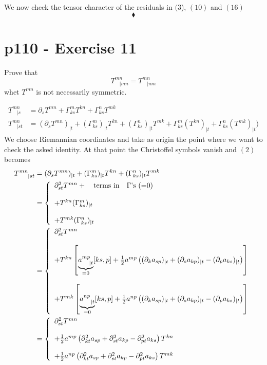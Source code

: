 We now check the tensor character of the residuals in $(3$), $(10)$ and $(16)$
$$\blacklozenge$$
\newpage



\section{p110 - Exercise 11}
\begin{tcolorbox}
Prove that $$T^{mn}_{\ \ \ \ |mn} =T^{mn}_{\ \ \ \ |nm}$$ whet $T^{mn}$ is not necessarily symmetric.
\end{tcolorbox}
\begin{align}
T^{mn}_{\ \ \ \ |s} &= \partial_s T^{mn} + \Gamma^m_{ks}T^{kn} + \Gamma^n_{ks}T^{mk}\\
T^{mn}_{\ \ \ \ |st} &= (\partial_s T^{mn})_{|t} + (\Gamma^m_{ks})_{|t}T^{kn} + (\Gamma^n_{ks})_{|t}T^{mk}+ \Gamma^m_{ks}(T^{kn})_{|t} + \Gamma^n_{ks}(T^{mk})_{|t})
\end{align}
We choose Riemannian coordinates and take as origin the point where we want to check the asked identity. At that point the Christoffel symbols vanish and $(2)$ becomes
\begin{align}
T^{mn}_{\ \ \ \ |st} &= (\partial_s T^{mn})_{|t} + (\Gamma^m_{ks})_{|t}T^{kn} + (\Gamma^n_{ks})_{|t}T^{mk}\\
&= \left\{\begin{array}{l}\partial^2_{st}T^{mn}+\quad \text{terms in}\quad \Gamma\text{'s (=0)}\\\\ + T^{kn} (\Gamma^m_{ks})_{|t}\\\\ + T^{mk} (\Gamma^n_{ks})_{|t}\end{array}\right.\\
&= \left\{\begin{array}{l}\partial^2_{st}T^{mn}\\\\ + T^{kn} \left[\underbrace{a^{mp}_{\ \ \ |t}}_{=0}[ks,p] + \half a^{mp} \left( (\partial_{k} a_{sp})_{|t} + (\partial_{s} a_{kp})_{|t} - (\partial_{p} a_{ks})_{|t} \right) \right]\\\\  + T^{mk} \left[\underbrace{a^{np}_{\ \ \ |t}}_{=0}[ks,p] + \half a^{np} \left( (\partial_{k} a_{sp})_{|t} + (\partial_{s} a_{kp})_{|t} - (\partial_{p} a_{ks})_{|t} \right) \right]\end{array}\right.\\
&= \left\{\begin{array}{l}\partial^2_{st}T^{mn}\\\\ +\half a^{mp} \left( \partial^2_{kt} a_{sp} + \partial^2_{st} a_{kp} - \partial^2_{pt} a_{ks} \right) T^{kn}  \\\\  + \half   a^{np} \left( \partial^2_{kt} a_{sp} + \partial^2_{st} a_{kp} - \partial^2_{pt} a_{ks}\right)T^{mk} \end{array}\right.
\end{align}
